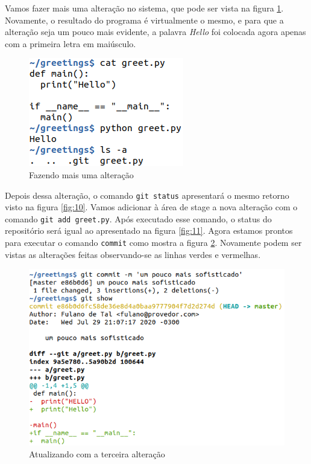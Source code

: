 \documentclass[a4paper]{book}
\begin{document}
Vamos fazer mais uma alteração no sistema, que pode ser
vista na figura \ref{fig:13}.
Novamente, o resultado do programa é virtualmente o mesmo,
e para que a alteração seja um pouco mais evidente, 
a palavra \textit{Hello} foi colocada agora apenas com
a primeira letra em maiúsculo.

\begin{figure}[ht]
\caption{Fazendo mais uma alteração}
\label{fig:13}
\centering
\includegraphics[scale=0.6]{"images/13-Fazendo mais uma alteração.png"}
\end{figure}

Depois dessa alteração, o comando \texttt{git status}
apresentará o mesmo retorno visto na figura \ref{fig:10}.
Vamos adicionar à área de stage a nova alteração com
o comando \texttt{git add greet.py}.
Após executado esse comando, o status do repositório
será igual ao apresentado na figura \ref{fig:11}.
%
Agora estamos prontos para executar o comando \texttt{commit} 
como mostra a figura \ref{fig:14}.
Novamente podem ser vistas as alterações feitas observando-se
as linhas verdes e vermelhas.

\begin{figure}[ht]
\caption{Atualizando com a terceira alteração}
\label{fig:14}
\centering
\includegraphics[scale=0.6]{"images/14-Atualizando com a terceira alteração.png"}
\end{figure}
\end{document}
